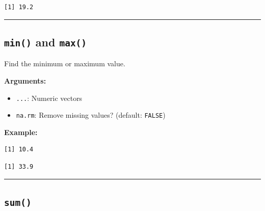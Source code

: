 \documentclass[
  letterpaper,
  DIV=11,
  numbers=noendperiod]{scrreprt}
\newenvironment{Shaded}{\begin{snugshade}}{\end{snugshade}}
\newcommand{\FunctionTok}[1]{\textcolor[rgb]{0.28,0.35,0.67}{#1}}
\newcommand{\NormalTok}[1]{\textcolor[rgb]{0.00,0.23,0.31}{#1}}
\newcommand{\SpecialCharTok}[1]{\textcolor[rgb]{0.37,0.37,0.37}{#1}}
\providecommand{\tightlist}{%
  \setlength{\itemsep}{0pt}\setlength{\parskip}{0pt}}
\begin{document}
\begin{verbatim}
[1] 19.2
\end{verbatim}

\begin{center}\rule{0.5\linewidth}{0.5pt}\end{center}

\subsection{\texorpdfstring{\texttt{min()} and
\texttt{max()}}{min() and max()}}\label{min-and-max}

Find the minimum or maximum value.

\textbf{Arguments:}

\begin{itemize}
\tightlist
\item
  \texttt{...}: Numeric vectors
\item
  \texttt{na.rm}: Remove missing values? (default: \texttt{FALSE})
\end{itemize}

\textbf{Example:}

\begin{Shaded}
\end{Shaded}

\begin{verbatim}
[1] 10.4
\end{verbatim}

\begin{Shaded}
\end{Shaded}

\begin{verbatim}
[1] 33.9
\end{verbatim}

\begin{center}\rule{0.5\linewidth}{0.5pt}\end{center}

\subsection{\texorpdfstring{\texttt{sum()}}{sum()}}\label{sum}
\end{document}
